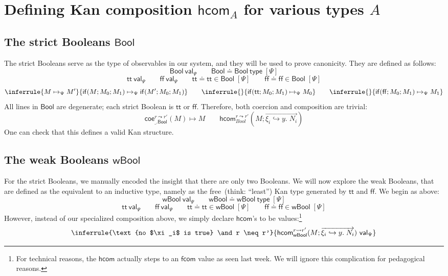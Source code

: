 \documentclass{article} \usepackage{chtt-notes} \usepackage{stmaryrd}
\renewcommand{\bool}{\mathsf{Bool}}
\newcommand{\wbool}{\mathsf{wBool}}
\newcommand{\hcom}{\mathsf{hcom}}
\newcommand{\coe}{\mathsf{coe}}
\newcommand{\ival}[1]{#1~\mathsf{val}}
\newcommand{\itype}[1]{#1~\mathsf{type}}
\newcommand{\di}[1]{\;[#1]}
\newcommand{\ps}{\di{\Psi}}
\newcommand{\T}{\mathsf{tt}}
\newcommand{\F}{\mathsf{ff}}
\newcommand{\If}{\mathsf{if}}
\newcommand{\hcomr}{(M; \overrightarrow{\xi_i \hookrightarrow y. \; N_i})}
\begin{document}
\maketitle

\section{Defining Kan composition $\hcom_A$ for various types $A$}
\subsection{The strict Booleans $\bool$}
The strict Booleans serve as the type of observables in our system, and they will be used to prove canonicity.
They are defined as follows:
\[ \ival{\bool}_{\Psi} \qquad \itype{\bool \doteq \bool} \ps \]
\[ \ival{\T}_{\Psi} \qquad \ival{\F}_{\Psi} \qquad \T \doteq \T \in \bool \ps \qquad \F \doteq \F \in \bool \ps \]
\[ \inferrule{M \mapsto_{\Psi} M'}{\If(M; M_0; M_1) \mapsto_{\Psi} \If(M'; M_0; M_1)} \qquad \inferrule{ }{\If(\T; M_0; M_1) \mapsto_{\Psi} M_0} \qquad \inferrule{ }{\If(\F; M_0; M_1) \mapsto_{\Psi} M_1} \]
All lines in $\bool$ are degenerate; each strict Boolean is $\T$ or $\F$. Therefore, both coercion and composition are trivial:
\[ \coe^{r \leadsto r'}_{\_.\bool}(M) \mapsto M \qquad \hcom^{r \leadsto r'}_{Bool}(M; \overrightarrow{\xi_i \hookrightarrow y. \; N_i})\]
One can check that this defines a valid Kan structure.

\subsection{The weak Booleans $\wbool$}
For the strict Booleans, we manually encoded the insight that there are only two Booleans.
We will now explore the weak Booleans, that are defined as the equivalent to an inductive type, namely as the free~(think: ``least'') Kan type generated by $\T$ and $\F$.
We begin as above:
\[ \ival{\wbool}_{\Psi} \qquad \itype{\wbool \doteq \wbool} \ps \]
\[ \ival{\T}_{\Psi} \qquad \ival{\F}_{\Psi} \qquad \T \doteq \T \in \wbool \ps \qquad \F \doteq \F \in \wbool \ps \]
However, instead of our specialized composition above, we simply declare $\hcom$'s to be values:\footnote{For technical reasons, the $\hcom$ actually steps to an $\mathsf{fcom}$ value as seen last week. We will ignore this complication for pedagogical reasons.}
\[ \inferrule{\text{no $\xi_i$ is true} \and r \neq r'}{\ival{\hcom^{r \leadsto r'}_{\wbool}\hcomr}_{\Psi}} \]
\end{document}
